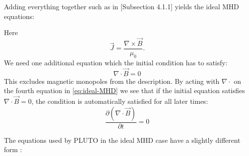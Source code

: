 Adding everything together such as in \cite{notes-principles-MHD}[Subsection 4.1.1] yields the ideal MHD equations:

{\centering 
\noindent {}
\par}

Here $$\vec{J} = \frac{\nabla\times \vec{B}}{\mu_0}. $$ We need one additional equation which the initial condition has to satisfy:
\begin{equation*}
	\nabla\cdot\vec{B}=0
\end{equation*}
This excludes magnetic monopoles from the description. By acting with $\nabla\cdot$ on the fourth equation in \cref{eq:ideal-MHD} we see that if the initial equation satisfies $\nabla\cdot\vec{B}=0$, the condition is automatically satisfied for all later times:
\begin{equation*}
	\frac{\partial (\nabla\cdot\vec{B})}{\partial t} = 0
\end{equation*}

The equations used by PLUTO in the ideal MHD case have a slightly different form \cite{pluto-manual} :

{\centering 
\noindent {}
\par}

